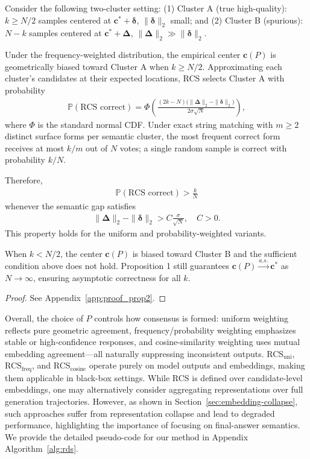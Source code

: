 \begin{prop}
Consider the following two-cluster setting: (1) Cluster A (true high-quality): \(k \geq N/2\) samples centered at \(\mathbf{c}^* + \boldsymbol{\delta}\), \(\|\boldsymbol{\delta}\|_2\) small; and (2) Cluster B (spurious): \(N-k\) samples centered at \(\mathbf{c}^* + \boldsymbol{\Delta}\), \(\|\boldsymbol{\Delta}\|_2 \gg \|\boldsymbol{\delta}\|_2\).

Under the frequency-weighted distribution, the empirical center \(\mathbf{c}(P)\) is geometrically biased toward Cluster A when \(k \geq N/2\). Approximating each cluster's candidates at their expected locations, RCS selects Cluster A with probability
\begin{align}
\mathbb{P}(\text{RCS correct})
= \Phi\left( \frac{(2k-N)\bigl(\|\boldsymbol{\Delta}\|_2 - \|\boldsymbol{\delta}\|_2\bigr)}{2\sigma\sqrt{N}} \right),
\end{align}
where \(\Phi\) is the standard normal CDF. Under exact string matching with \(m \geq 2\) distinct surface forms per semantic cluster, the most frequent correct form receives at most \(k/m\) out of \(N\) votes; a single random sample is correct with probability \(k/N\).

Therefore,
\begin{align}
\mathbb{P}(\text{RCS correct}) > \frac{k}{N}
\end{align}
whenever the semantic gap satisfies
\begin{align}
\|\boldsymbol{\Delta}\|_2 - \|\boldsymbol{\delta}\|_2 > C\frac{\sigma}{\sqrt{N}}, \quad C > 0.
\end{align}
This property holds for the uniform and probability-weighted variants.
\begin{remark}
When \(k < N/2\), the center \(\mathbf{c}(P)\) is biased toward Cluster B and the sufficient condition above does not hold. Proposition 1 still guarantees \(\mathbf{c}(P) \xrightarrow{a.s.} \mathbf{c}^*\) as \(N \to \infty\), ensuring asymptotic correctness for all \(k\).
\end{remark}
\end{prop}
\begin{proof}
    See Appendix~\ref{app:proof_prop2}.
\end{proof}

Overall, the choice of $P$ controls how consensus is formed: uniform weighting reflects pure geometric agreement, frequency/probability weighting emphasizes stable or high-confidence responses, and cosine-similarity weighting uses mutual embedding agreement---all naturally suppressing inconsistent outputs. 
RCS$_\text{uni}$, RCS$_\text{freq}$, and RCS$_\text{cosine}$ operate purely on model outputs and embeddings, making them applicable in black-box settings.
While RCS is defined over candidate-level embeddings, one may alternatively consider aggregating representations over full generation trajectories. However, as shown in Section~\ref{sec:embedding-collapse}, such approaches suffer from representation collapse and lead to degraded performance, highlighting the importance of focusing on final-answer semantics. 
We provide the detailed pseudo-code for our method in Appendix Algorithm~\ref{alg:rds}.